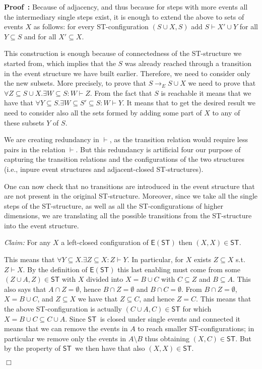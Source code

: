 \documentclass[submission,copyright,creativecommons]{eptcs}
\newenvironment{proof}[1][\!\!\,]{\vspace{1ex}\noindent\textbf{Proof #1: }}{\hfill$\Box$\vspace{2ex}}
\newcommand\ST{\ensuremath{\mathsf{ST}}}
\newcommand\stepTransEvGlabbeek{\ensuremath{\rightarrow_{E}}}
\newcommand\enableRelEv{\ensuremath{\vdash}}
\newcommand\stintoe{\ensuremath{\mathsf{E}}}
\begin{document}
\begin{proof}
Because of adjacency, and thus because for steps with more events all the intermediary single steps exist, it is enough to extend the above to sets of events $X$ as follows: for every ST-configuration $(S\cup X,S)$ add  $S\enableRelEv X'\cup Y$ for all $Y\subseteq S$ and for all $X'\subseteq X$.

This construction is enough because of connectedness of the ST-structure we started from, which implies that the $S$ was already reached through a transition in the event structure we have built earlier. Therefore, we need to consider only the new subsets. More precisely, to prove that $S\stepTransEvGlabbeek S\cup X$ we need to prove that $\forall Z\subseteq S\cup X.\exists W\subseteq S: W\enableRelEv Z$. From the fact that $S$ is reachable it means that we have that $\forall Y\subseteq S.\exists W\subseteq S'\subseteq S:W\enableRelEv Y$. It means that to get the desired result we need to consider also all the sets formed by adding some part of $X$ to any of these subsets $Y$ of $S$.

We are creating redundancy in \enableRelEv, as the transition relation would require less pairs in the relation \enableRelEv. But this redundancy is artificial four our purpose of capturing the transition relations and the configurations of the two structures (i.e., inpure event structures and adjacent-closed ST-structures).



One can now check that no transitions are introduced in the event structure that are not present in the original ST-structure. Moreover, since we take all the single steps of the ST-structure, as well as all the ST-configurations of higher dimensions, we are translating all the possible transitions from the ST-structure into the event structure.

\vspace{1ex}
\noindent\textit{Claim:}\hspace{1ex} For any $X$ a left-closed configuration of $\stintoe(\ST)$ then $(X,X)\in\ST$.
\vspace{0.5ex}

This means that $\forall Y\subseteq X.\exists Z\subseteq X:Z\enableRelEv Y$. In particular, for $X$ exists $Z\subseteq X$ s.t.\ $Z\enableRelEv X$. 
By the definition of $\stintoe(\ST)$ this last enabling must come from some $(Z\cup A,Z)\in\ST$ with $X$ divided into $X=B\cup C$ with $C\subseteq Z$ and $B\subseteq A$. This also says that $A\cap Z=\emptyset$, hence $B\cap Z=\emptyset$ and $B\cap C=\emptyset$. From $B\cap Z=\emptyset$, $X=B\cup C$, and $Z\subseteq X$ we have that $Z\subseteq C$, and hence $Z=C$. This means that the above ST-configuration is actually $(C\cup A,C)\in\ST$ for which $X=B\cup C\subseteq C\cup A$. Since \ST\ is closed under single events and connected it means that we can remove the events in $A$ to reach smaller ST-configurations; in particular we remove only the events in $A\setminus B$ thus obtaining $(X,C)\in\ST$. But by the property of \ST\ we then have that also $(X,X)\in\ST$.


\end{proof}
\end{document}
